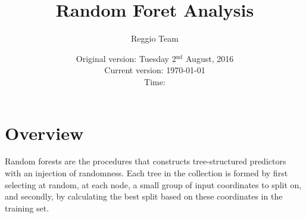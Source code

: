 \documentclass[11pt]{article}
\begin{document}
\title{Random Foret Analysis}
\author{Reggio Team}
\date{Original version: Tuesday 2$^{\text{nd}}$ August, 2016 \\ Current version: \today \\ \vspace{1em} Time: \currenttime}
\maketitle

\doublespacing

\section{Overview}

Random forests are the procedures that constructs tree-structured predictors with an injection of randomness. Each tree in the collection is formed by first selecting at random, at each node, a small group of input coordinates to split on, and secondly, by calculating the best split based on these coordinates in the training set. 
\end{document}
